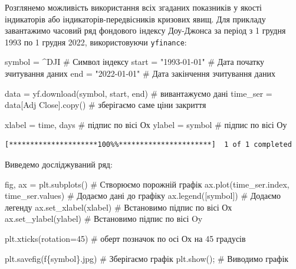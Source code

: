 \documentclass[
  letterpaper,
]{report}
\newenvironment{Shaded}{\begin{snugshade}}{\end{snugshade}}
\newcommand{\CommentTok}[1]{\textcolor[rgb]{0.37,0.37,0.37}{#1}}
\newcommand{\DecValTok}[1]{\textcolor[rgb]{0.68,0.00,0.00}{#1}}
\newcommand{\NormalTok}[1]{\textcolor[rgb]{0.00,0.23,0.31}{#1}}
\newcommand{\OperatorTok}[1]{\textcolor[rgb]{0.37,0.37,0.37}{#1}}
\newcommand{\SpecialCharTok}[1]{\textcolor[rgb]{0.37,0.37,0.37}{#1}}
\newcommand{\SpecialStringTok}[1]{\textcolor[rgb]{0.13,0.47,0.30}{#1}}
\newcommand{\StringTok}[1]{\textcolor[rgb]{0.13,0.47,0.30}{#1}}
\begin{document}
Розглянемо можливість використання всіх згаданих показників у якості
індикаторів або індикаторів-передвісників кризових явищ. Для прикладу
завантажимо часовий ряд фондового індексу Доу-Джонса за період з 1
грудня 1993 по 1 грудня 2022, використовуючи \texttt{yfinance}:

\begin{Shaded}
\begin{Highlighting}[]
\NormalTok{symbol }\OperatorTok{=} \StringTok{\textquotesingle{}\^{}DJI\textquotesingle{}}          \CommentTok{\# Символ індексу}
\NormalTok{start }\OperatorTok{=} \StringTok{"1993{-}01{-}01"}     \CommentTok{\# Дата початку зчитування даних}
\NormalTok{end }\OperatorTok{=} \StringTok{"2022{-}01{-}01"}       \CommentTok{\# Дата закінчення зчитування даних}

\NormalTok{data }\OperatorTok{=}\NormalTok{ yf.download(symbol, start, end)  }\CommentTok{\# вивантажуємо дані}
\NormalTok{time\_ser }\OperatorTok{=}\NormalTok{ data[}\StringTok{\textquotesingle{}Adj Close\textquotesingle{}}\NormalTok{].copy()     }\CommentTok{\# зберігаємо саме ціни закриття}

\NormalTok{xlabel }\OperatorTok{=} \StringTok{\textquotesingle{}time, days\textquotesingle{}}    \CommentTok{\# підпис по вісі Ох }
\NormalTok{ylabel }\OperatorTok{=}\NormalTok{ symbol          }\CommentTok{\# підпис по вісі Оу}
\end{Highlighting}
\end{Shaded}

\begin{verbatim}
[*********************100%%**********************]  1 of 1 completed
\end{verbatim}

Виведемо досліджуваний ряд:

\begin{Shaded}
\begin{Highlighting}[]
\NormalTok{fig, ax }\OperatorTok{=}\NormalTok{ plt.subplots()                   }\CommentTok{\# Створюємо порожній графік}
\NormalTok{ax.plot(time\_ser.index, time\_ser.values)   }\CommentTok{\# Додаємо дані до графіку}
\NormalTok{ax.legend([symbol])                        }\CommentTok{\# Додаємо легенду}
\NormalTok{ax.set\_xlabel(xlabel)                      }\CommentTok{\# Встановимо підпис по вісі Ох}
\NormalTok{ax.set\_ylabel(ylabel)                      }\CommentTok{\# Встановимо підпис по вісі Oy}

\NormalTok{plt.xticks(rotation}\OperatorTok{=}\DecValTok{45}\NormalTok{)                    }\CommentTok{\# оберт позначок по осі Ох на 45 градусів}

\NormalTok{plt.savefig(}\SpecialStringTok{f\textquotesingle{}}\SpecialCharTok{\{}\NormalTok{symbol}\SpecialCharTok{\}}\SpecialStringTok{.jpg\textquotesingle{}}\NormalTok{)               }\CommentTok{\# Зберігаємо графік }
\NormalTok{plt.show()}\OperatorTok{;}                                \CommentTok{\# Виводимо графік}
\end{Highlighting}
\end{Shaded}
\end{document}
